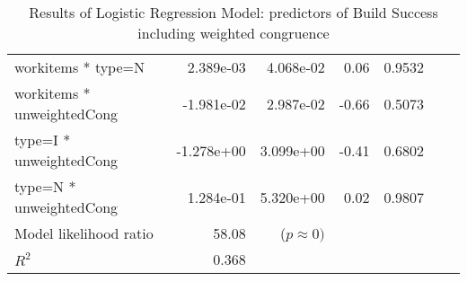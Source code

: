 \begin{table*}
\begin{center}
\begin{tabular}{lrrrrrr}
workitems * type=N         &  2.389e-03 & 4.068e-02 &  0.06  & 0.9532 &              &  \\
workitems * unweightedCong & -1.981e-02 & 2.987e-02 & -0.66  & 0.5073 &              &  \\
type=I * unweightedCong    & -1.278e+00 & 3.099e+00 & -0.41  & 0.6802 &              &  \\
type=N * unweightedCong    &  1.284e-01 & 5.320e+00 &  0.02  & 0.9807 &              &  \\
	\hline
Model likelihood ratio & 58.08 & ($p \approx 0)$ & & & &	 \\
$R^2$ & 0.368 & & & & & \\
	\hline
\end{tabular}
\end{center}
\caption{Results of Logistic Regression Model: predictors of Build Success including weighted congruence}
\label{tab:logr_weighted}
\end{table*}
